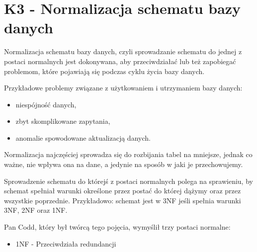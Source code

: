 \section{K3 - Normalizacja schematu bazy danych}

Normalizacja schematu bazy danych, czyli sprowadzanie schematu do jednej z postaci normalnych jest dokonywana, aby przeciwdziałać lub też zapobiegać problemom, które pojawiają się podczas cyklu życia bazy danych.

Przykładowe problemy związane z użytkowaniem i utrzymaniem bazy danych:
\begin{itemize}
	\item{niespójność danych,}
	\item{zbyt skomplikowane zapytania,}
	\item{anomalie spowodowane aktualizacją danych.}
\end{itemize}

Normalizacja najczęściej sprowadza się do rozbijania tabel na mniejsze, jednak co ważne, nie wpływa ona na dane, a jedynie na sposób w jaki je przechowujemy.

Sprowadzenie schematu do którejś z postaci normalnych polega na sprawieniu, by schemat spełniał warunki określone przez postać do której dążymy oraz przez wszystkie poprzednie. Przykładowo: schemat jest w 3NF jeśli spełnia warunki 3NF, 2NF oraz 1NF.

Pan Codd, który był twórcą tego pojęcia, wymyślił trzy postaci normalne:
\begin{itemize}
	\item{1NF} - Przeciwdziała redundancji
\end{itemize}